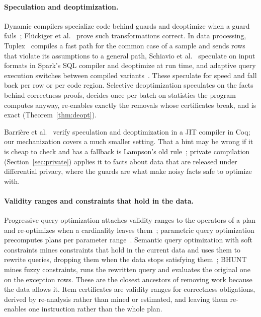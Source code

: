 \paragraph{Speculation and deoptimization.} Dynamic compilers specialize code behind guards and
deoptimize when a guard fails~\cite{holzle1992}; Flückiger et al.~\cite{flueckiger2018} prove such
transformations correct. In data processing, Tuplex~\cite{spiegelberg2021} compiles a fast path for
the common case of a sample and sends rows that violate its assumptions to a general path, Schiavio
et al.~\cite{schiavio2020} speculate on input formats in Spark's SQL compiler and deoptimize at run
time, and adaptive query execution switches between compiled variants~\cite{kohn2018}. These
speculate for speed and fall back per row or per code region. Selective deoptimization speculates on
the facts behind correctness proofs, decides once per batch on statistics the program computes
anyway, re-enables exactly the removals whose certificates break, and is exact
(Theorem~\ref{thm:deopt}).

Barrière et al.~\cite{barriere2021} verify speculation and deoptimization in a JIT compiler in Coq;
our mechanization covers a much smaller setting. That a hint may be wrong if it is cheap to check
and has a fallback is Lampson's old rule~\cite{lampson1983}; private compilation
(Section~\ref{sec:private}) applies it to facts about data that are released under differential
privacy, where the guards are what make noisy facts safe to optimize with.

\paragraph{Validity ranges and constraints that hold in the data.} Progressive query optimization
attaches validity ranges to the operators of a plan and re-optimizes when a cardinality leaves
them~\cite{markl2004}; parametric query optimization precomputes plans per parameter
range~\cite{ioannidis1992}. Semantic query optimization with soft constraints mines constraints that
hold in the current data and uses them to rewrite queries, dropping them when the data stops
satisfying them~\cite{godfrey2001}; BHUNT~\cite{brown2003} mines fuzzy constraints, runs the rewritten
query and evaluates the original one on the exception rows. These are the closest ancestors of
removing work because the data allows it. Item certificates are validity ranges for correctness
obligations, derived by re-analysis rather than mined or estimated, and leaving them re-enables one
instruction rather than the whole plan.

